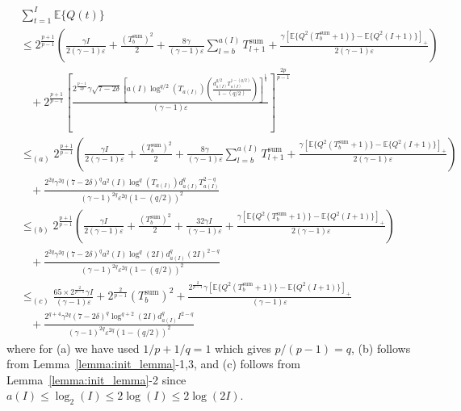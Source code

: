 \documentclass[12pt,draftcls, onecolumn]{IEEEtran}
\begin{document}
\begin{align}\label{eqn:last_holder}
   &\sum_{t=1}^{I} \mathbb{E}\{Q(t)\}  \nonumber\\&\leq 2^{\frac{p+1}{p-1}}\left(\frac{\gamma I}{2(\gamma-1) \varepsilon}+\frac{(T_b^{\text{sum}})^2}{2}+\frac{8\gamma}{(\gamma-1)\varepsilon}\sum_{l=b}^{a(I)}T^{\text{sum}}_{l+1}  +\frac{\gamma\left[\mathbb{E}\{Q^2(T^{\text{sum}}_b+1)\}-\mathbb{E}\{Q^2( I+1)\}\right]_+}{2(\gamma-1)\varepsilon}\right) \nonumber\\&\ \ \ \  +  2^{\frac{p+1}{p-1}}\left[\frac{2^{\frac{p-1}{2p}}\gamma\sqrt{7-2\delta}\left[a(I)\log^{q/2}(T_{a(I)})\left(\frac{d_{a(I)}^{q/2}T_{a(I)}^{1-(q/2)}}{1-(q/2)}\right) \right]^{\frac{1}{q}}}{(\gamma-1)\varepsilon}\right]^{\frac{2p}{p-1}}\nonumber\\&\leq_{(a)} 2^{\frac{p+1}{p-1}}\left(\frac{\gamma I}{2(\gamma-1) \varepsilon}+\frac{(T_b^{\text{sum}})^2}{2}+\frac{8\gamma}{(\gamma-1)\varepsilon}\sum_{l=b}^{a(I)}T^{\text{sum}}_{l+1} +\frac{\gamma\left[\mathbb{E}\{Q^2(T^{\text{sum}}_b+1)\}-\mathbb{E}\{Q^2( I+1)\}\right]_+}{2(\gamma-1)\varepsilon}\right) \nonumber\\&\ \ \ \  +\frac{2^{2q}\gamma^{2q}(7-2\delta)^qa^2(I) \log^{q}(T_{a(I)})d^q_{a(I)}T_{a(I)}^{2-q}}{(\gamma-1)^{2q}\varepsilon^{2q}(1-(q/2))^2} \nonumber\\&\leq_{(b)} 2^{\frac{p+1}{p-1}}\left(\frac{\gamma I}{2(\gamma-1) \varepsilon}+\frac{(T_b^{\text{sum}})^2}{2}+\frac{32\gamma I}{(\gamma-1)\varepsilon} +\frac{\gamma\left[\mathbb{E}\{Q^2(T^{\text{sum}}_b+1)\}-\mathbb{E}\{Q^2( I+1)\}\right]_+}{2(\gamma-1)\varepsilon}\right) \nonumber\\&\ \ \ \  +\frac{2^{2q}\gamma^{2q}(7-2\delta)^qa^2(I) \log^{q}(2I)d^q_{a(I)}(2I)^{2-q}}{(\gamma-1)^{2q}\varepsilon^{2q}(1-(q/2))^2} \nonumber\\&\leq_{(c)} \frac{65\times 2^{\frac{2}{p-1}}\gamma I}{(\gamma-1) \varepsilon}+2^{\frac{2}{p-1}}(T_b^{\text{sum}})^2+\frac{2^{\frac{2}{p-1}}\gamma\left[\mathbb{E}\{Q^2(T^{\text{sum}}_b+1)\}-\mathbb{E}\{Q^2( I+1)\}\right]_+}{(\gamma-1)\varepsilon}\nonumber\\&\ \ \ \  +\frac{2^{q+4}\gamma^{2q}(7-2\delta)^q \log^{q+2}(2I)d^q_{a(I)}I^{2-q}}{(\gamma-1)^{2q}\varepsilon^{2q}(1-(q/2))^2} 
\end{align}
where for (a) we have used $1/p + 1/q = 1$ which gives $p/(p-1) = q$, (b) follows from Lemma~\ref{lemma:init_lemma}-1,3, and (c) follows from Lemma~\ref{lemma:init_lemma}-2 since $a(I) \leq \log_2(I) \leq 2\log(I) \leq 2\log(2I)$.
\end{document}
